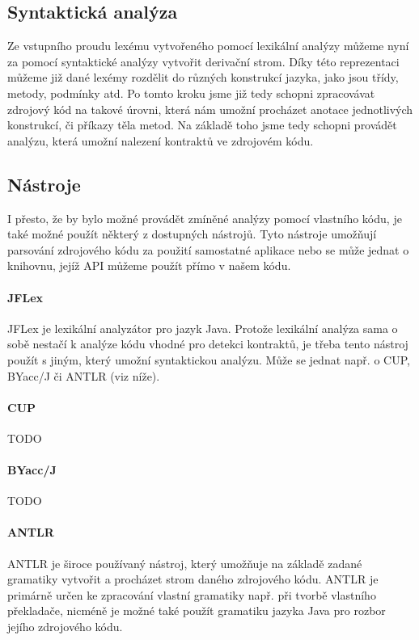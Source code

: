 		\subsection{Syntaktická analýza}
			Ze vstupního proudu lexému vytvořeného pomocí lexikální analýzy můžeme nyní za pomocí syntaktické analýzy vytvořit derivační strom. Díky této reprezentaci můžeme již dané lexémy rozdělit do různých konstrukcí jazyka, jako jsou třídy, metody, podmínky atd. Po tomto kroku jsme již tedy schopni zpracovávat zdrojový kód na takové úrovni, která nám umožní procházet anotace jednotlivých konstrukcí, či příkazy těla metod. Na základě toho jsme tedy schopni provádět analýzu, která umožní nalezení kontraktů ve zdrojovém kódu. 			
			
		\subsection{Nástroje}
			I přesto, že by bylo možné provádět zmíněné analýzy pomocí vlastního kódu, je také možné použít některý z dostupných nástrojů. Tyto nástroje umožňují parsování zdrojového kódu za použití samostatné aplikace nebo se může jednat o knihovnu, jejíž API můžeme použít přímo v našem kódu.
			
			\paragraph{JFLex}
				JFLex \cite{jflex} je lexikální analyzátor pro jazyk Java. Protože lexikální analýza sama o sobě nestačí k analýze kódu vhodné pro detekci kontraktů, je třeba tento nástroj použít s jiným, který umožní syntaktickou analýzu. Může se jednat např. o CUP, BYacc/J či ANTLR (viz níže). 						
			
			\paragraph{CUP}
				TODO
			
			\paragraph{BYacc/J}
				TODO
			
			\paragraph{ANTLR}			
				ANTLR \cite{antlr} je široce používaný nástroj, který umožňuje na základě zadané gramatiky vytvořit a procházet strom daného zdrojového kódu. ANTLR je primárně určen ke zpracování vlastní gramatiky např. při tvorbě vlastního překladače, nicméně je možné také použít gramatiku jazyka Java pro rozbor jejího zdrojového kódu.
			
